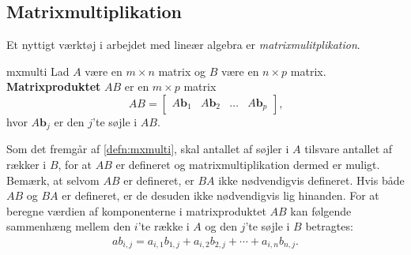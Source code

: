\subsection{Matrixmultiplikation}
%
Et nyttigt værktøj i arbejdet med lineær algebra er \textit{matrixmulitplikation}.
%
\begin{defn}{}{mxmulti}
Lad $A$ være en $m \times n$ matrix og $B$ være en $n \times p$ matrix.
\textbf{Matrixproduktet} $AB$  er en $m \times p$ matrix 
$$
AB=
\begin{bmatrix}
A\textbf{b}_1 & A\textbf{b}_2 & \ldots & A\textbf{b}_p
\end{bmatrix}\text{,}
$$
hvor $A\textbf{b}_j$ er den $j$'te søjle i $AB$.
\end{defn}
\noindent
%
Som det fremgår af \ref{defn:mxmulti}, skal antallet af søjler i $A$ tilsvare antallet af rækker i $B$, for at $AB$ er defineret og matrixmultiplikation dermed er muligt. 
Bemærk, at selvom $AB$ er defineret, er $BA$ ikke nødvendigvis defineret. 
Hvis både $AB$ og $BA$ er defineret, er de desuden ikke nødvendigvis lig hinanden. 
For at beregne værdien af komponenterne i matrixproduktet $AB$ kan følgende sammenhæng mellem den $i$'te række i $A$ og den $j$'te søjle i $B$ betragtes: 
\begin{align*}
ab_{i,j} = a_{i,1}b_{1,j} + a_{i,2}b_{2,j} + \cdots + a_{i,n}b_{n,j}
\text{.}
\end{align*}
%
